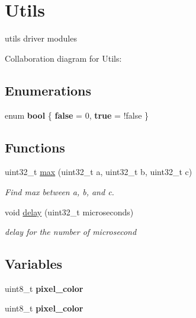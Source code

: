 \hypertarget{group___utils}{}\section{Utils}
\label{group___utils}


utils driver modules  


Collaboration diagram for Utils\+:
\subsection*{Enumerations}
\begin{DoxyCompactItemize}
\item 
\mbox{\label{group___utils_gaf6a258d8f3ee5206d682d799316314b1}} 
enum {\bfseries bool} \{ {\bfseries false} = 0, 
{\bfseries true} = !false
 \}
\end{DoxyCompactItemize}
\subsection*{Functions}
\begin{DoxyCompactItemize}
\item 
uint32\+\_\+t \hyperlink{group___utils_gafa33c555a40e71b0cc32aa3731f6fabe}{max} (uint32\+\_\+t a, uint32\+\_\+t b, uint32\+\_\+t c)
\begin{DoxyCompactList}\small\item\em Find max between a, b, and c. \end{DoxyCompactList}\item 
void \hyperlink{group___utils_gaf1a8629740f19d111a55636a19c2bf08}{delay} (uint32\+\_\+t microseconds)
\begin{DoxyCompactList}\small\item\em delay for the number of microsecond \end{DoxyCompactList}\end{DoxyCompactItemize}
\subsection*{Variables}
\begin{DoxyCompactItemize}
\item 
\mbox{\label{group___utils_ga91a0f4b54880f52e0b02f7aeb96ca304}} 
uint8\+\_\+t {\bfseries pixel\+\_\+color}
\item 
\mbox{\label{group___utils_ga91a0f4b54880f52e0b02f7aeb96ca304}} 
uint8\+\_\+t {\bfseries pixel\+\_\+color}
\end{DoxyCompactItemize}


